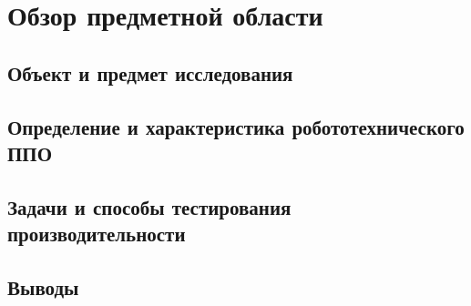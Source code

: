 \chapter{Обзор предметной области}
\section{Объект и предмет исследования}

\section{Определение и характеристика робототехнического ППО}

\section{Задачи и способы тестирования производительности}

\section{Выводы}
